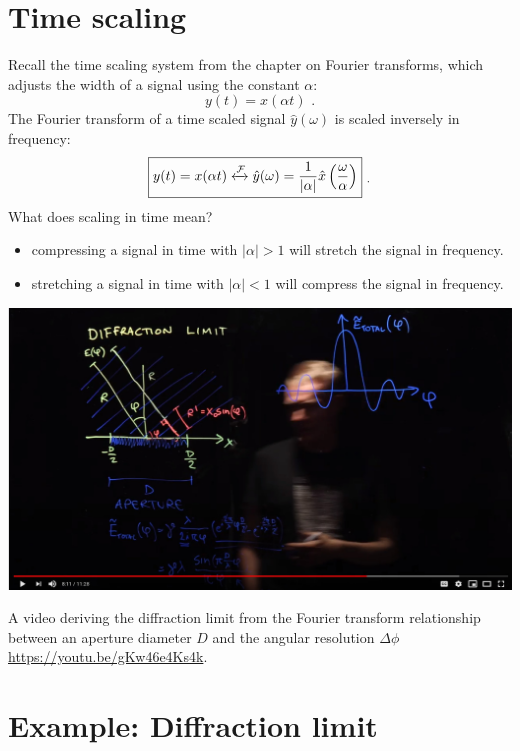\section{Time scaling}

Recall the time scaling system from the chapter on Fourier transforms,
which adjusts the width of a signal using the constant $\alpha$:
\begin{equation}
  y(t) = x(\alpha t) \,\,.
\end{equation}
The Fourier transform of a time scaled signal $\hat{y}(\omega)$ is
scaled inversely in frequency:
\begin{align}
  \boxed{
    y(t) = x(\alpha t) \xleftrightarrow{\mathcal{F}} \hat{y}(\omega) = \frac{1}{|\alpha|}\hat{x}\left(\frac{\omega}{\alpha}\right)
  } \,\, _.
\end{align}
What does scaling in time mean?
\begin{itemize}
  \item compressing a signal in time with $|\alpha|>1$ will stretch the signal in frequency.
  \item stretching a signal in time with $|\alpha|<1$ will compress the signal in frequency.
\end{itemize}

\begin{marginfigure}[-6cm]
  \begin{center}
    \includegraphics[width=\textwidth]{ch14/figures/video0.jpg}
  \end{center}
  \caption{A video deriving the diffraction limit from the Fourier transform relationship
    between an aperture diameter $D$ and the angular resolution $\Delta \phi$ \url{https://youtu.be/gKw46e4Ks4k}.}
\end{marginfigure}


\section{Example: Diffraction limit}


